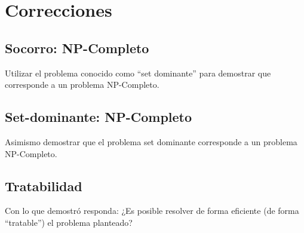 \documentclass[titlepage,a4paper]{article}
\begin{document}
\newpage\section{Correcciones}\label{sec:correcciones}

\setcounter{subsection}{0}%
\renewcommand{\thesubsection}{\arabic{subsection}}%

\subsection{Socorro: NP-Completo}\label{sec:correcciones_parte2_1}
\begin{tcolorbox}[colback=blue!5!white,colframe=blue!75!black,title=Enunciado P2.1]
    Utilizar el problema conocido como “set dominante” para demostrar
    que corresponde a un problema NP-Completo.
\end{tcolorbox}



\newpage\subsection{Set-dominante: NP-Completo}\label{sec:correcciones_parte2_2}
\begin{tcolorbox}[colback=blue!5!white,colframe=blue!75!black,title=Enunciado P2.2]
    Asimismo demostrar que el problema set dominante corresponde a un problema NP-Completo.
\end{tcolorbox}



\newpage\subsection{Tratabilidad}\label{sec:correcciones_parte2_3}
\begin{tcolorbox}[colback=blue!5!white,colframe=blue!75!black,title=Enunciado P2.2]
    Con lo que demostró responda: ¿Es posible resolver de forma eficiente
    (de forma “tratable”) el problema planteado?
\end{tcolorbox}


\end{document}
